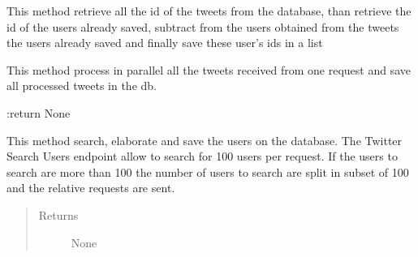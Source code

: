 \documentclass[letterpaper,10pt,english]{sphinxmanual}
\begin{document}
\begin{fulllineitems}
\begin{fulllineitems}
\begin{quote}
\begin{description}
\end{description}\end{quote}

\end{fulllineitems}


\begin{fulllineitems}
\label{\detokenize{code_comment/user_search:hate_tweet_map.users_searcher.SearchUsers.UserSearch.__retrieve_users_id}}
\sphinxAtStartPar
This method retrieve all the id of the tweets from the database, than retrieve the id of the users already
saved, subtract from the users obtained from the tweets the users already saved and finally save these user’s
ids in a list

\end{fulllineitems}


\begin{fulllineitems}
\label{\detokenize{code_comment/user_search:hate_tweet_map.users_searcher.SearchUsers.UserSearch.__save}}
\sphinxAtStartPar
This method process in parallel all the tweets received from one request and save
all processed tweets in the db.

\sphinxAtStartPar
:return None

\end{fulllineitems}


\begin{fulllineitems}
\label{\detokenize{code_comment/user_search:hate_tweet_map.users_searcher.SearchUsers.UserSearch.search}}
\sphinxAtStartPar
This method search, elaborate and save the users on the database.
The Twitter Search Users endpoint allow to search for 100 users per request.
If the users to search are more than 100 the number of users to search are split in subset of 100
and the relative requests are sent.
\begin{quote}\begin{description}
\item[{Returns}] \leavevmode
\sphinxAtStartPar
None


\end{description}
\end{quote}
\end{fulllineitems}
\end{fulllineitems}
\end{document}
